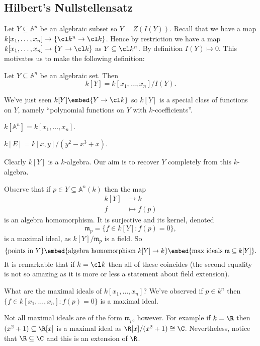 \documentclass[a4paper]{article}
\renewcommand{\A}{\mathbb{A}}
\begin{document}
\subsection{Hilbert's Nullstellensatz}

Let \(Y \subseteq \A^n\) be an algebraic subset so \(Y = Z(I(Y))\). Recall that we have a map \(k[x_1, \dots, x_n] \to \{\cl k^n \to \cl k\}\). Hence by restriction we have a map \(k[x_1, \dots, x_n] \to \{Y \to \cl k\}\) as \(Y \subseteq \cl k^n\). By definition \(I(Y) \mapsto 0\). This motivates us to make the following definition:

\begin{definition}
  Let \(Y \subseteq \A^n\) be an algebraic set. Then
  \[
    k[Y] = k[x_1, \dots, x_n]/I(Y).
  \]
\end{definition}

We've just seen \(k[Y] \embed \{Y \to \cl k\}\) so \(k[Y]\) is a special class of functions on \(Y\), namely ``polynomial functions on \(Y\) with \(k\)-coefficients''.

\begin{eg}
  \(k[\A^n] = k[x_1, \dots, x_n]\).

  \(k[E] = k[x, y]/(y^2 - x^3 + x)\).
\end{eg}

Clearly \(k[Y]\) is a \(k\)-algebra. Our aim is to recover \(Y\) completely from this \(k\)-algebra.

Observe that if \(p \in Y \subseteq \A^n(k)\) then the map
\begin{align*}
  k[Y] &\to k \\
  f &\mapsto f(p)
\end{align*}
is an algebra homomorphism. It is surjective and its kernel, denoted
\[
  \mathfrak m_p = \{f \in k[Y]: f(p) = 0\},
\]
is a maximal ideal, as \(k[Y]/\mathfrak m_p\) is a field. So
\[
  \{\text{points in } Y\} \embed \{\text{algebra homomorphism } k[Y] \to k\} \embed \{\text{max ideals } \mathfrak m \subseteq k[Y]\}.
\]
It is remarkable that if \(k = \cl k\) then all of these coincides (the second equality is not so amazing as it is more or less a statement about field extension).

What are the maximal ideals of \(k[x_1, \dots, x_n]\)? We've observed if \(p \in k^n\) then \(\{f \in k[x_1, \dots, x_n]: f(p) = 0\}\) is a maximal ideal.

Not all maximal ideals are of the form \(\mathfrak m_p\), however. For example if \(k = \R\) then \((x^2 + 1) \subseteq \R[x]\) is a maximal ideal as \(\R[x]/(x^2 + 1) \cong \C\). Nevertheless, notice that \(\R \subseteq \C\) and this is an extension of \(\R\).
\end{document}
